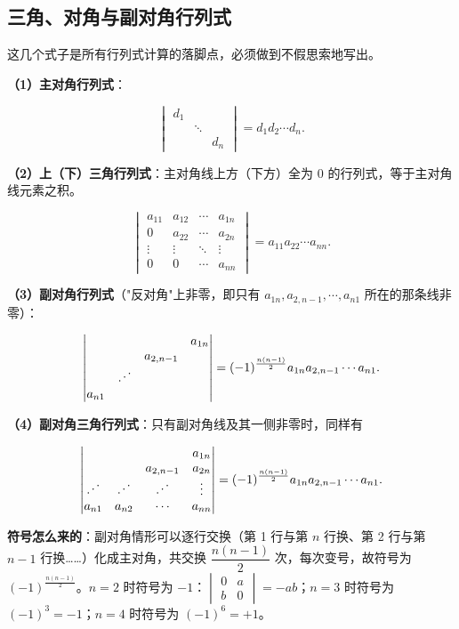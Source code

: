 \documentclass[11pt,openany,UTF8]{ctexbook}
\providecommand{\iddots}{\reflectbox{$\ddots$}}
\begin{document}
\subsection{三角、对角与副对角行列式}

这几个式子是所有行列式计算的落脚点，必须做到不假思索地写出。

\textbf{（1）主对角行列式}：

\[\begin{vmatrix}d_1&&\\&\ddots&\\&&d_n\end{vmatrix}=d_1d_2\cdots d_n .\]

\textbf{（2）上（下）三角行列式}：主对角线上方（下方）全为 $0$ 的行列式，等于主对角线元素之积。

\[\begin{vmatrix}a_{11}&a_{12}&\cdots&a_{1n}\\0&a_{22}&\cdots&a_{2n}\\\vdots&\vdots&\ddots&\vdots\\0&0&\cdots&a_{nn}\end{vmatrix}=a_{11}a_{22}\cdots a_{nn}.\]

\textbf{（3）副对角行列式}（"反对角"上非零，即只有 $a_{1n},a_{2,n-1},\cdots,a_{n1}$ 所在的那条线非零）：

\[\begin{vmatrix}&&&a_{1n}\\&&a_{2,n-1}&\\&\iddots&&\\a_{n1}&&&\end{vmatrix}=(-1)^{\frac{n(n-1)}{2}}a_{1n}a_{2,n-1}\cdots a_{n1}.\]

\textbf{（4）副对角三角行列式}：只有副对角线及其一侧非零时，同样有

\[\begin{vmatrix}&&&a_{1n}\\&&a_{2,n-1}&a_{2n}\\\iddots&\iddots&\iddots&\vdots\\a_{n1}&a_{n2}&\cdots&a_{nn}\end{vmatrix}=(-1)^{\frac{n(n-1)}{2}}a_{1n}a_{2,n-1}\cdots a_{n1}.\]

\textbf{符号怎么来的}：副对角情形可以逐行交换（第 1 行与第 $n$ 行换、第 2 行与第 $n-1$ 行换……）化成主对角，共交换 $\dfrac{n(n-1)}{2}$ 次，每次变号，故符号为 $(-1)^{\frac{n(n-1)}{2}}$。$n=2$ 时符号为 $-1$：$\begin{vmatrix}0&a\\b&0\end{vmatrix}=-ab$；$n=3$ 时符号为 $(-1)^3=-1$；$n=4$ 时符号为 $(-1)^6=+1$。
\end{document}
